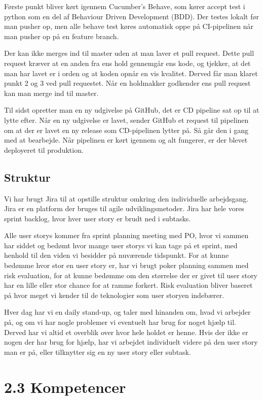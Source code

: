 \documentclass[11pt]{report}
\begin{document}
Første punkt bliver kørt igennem Cucumber’s Behave, som kører accept test i python som en del af Behaviour Driven Development (BDD). 
Der testes lokalt før man pusher op, men alle behave test køres automatisk oppe på CI-pipelinen når man pusher op på en feature branch. 

Der kan ikke merges ind til master uden at man laver et pull request. 
Dette pull request kræver at en anden fra ens hold gennemgår ens kode, og tjekker, at det man har lavet er i orden 
og at koden opnår en vis kvalitet. Derved får man klaret punkt 2 og 3 ved pull requestet. 
Når en holdmakker godkender ens pull request kan man merge ind til master.

Til sidst opretter man en ny udgivelse på GitHub, det er CD pipeline sat op til at lytte efter. 
Når en ny udgivelse er lavet, sender GitHub et request til pipelinen om at der er lavet en ny release som CD-pipelinen lytter på. 
Så går den i gang med at bearbejde. Når pipelinen er kørt igennem og alt fungerer, er der blevet deployeret til produktion. 


\subsection*{Struktur}
Vi har brugt Jira til at opstille struktur omkring den individuelle arbejdsgang. 
Jira er en platform der bruges til agile udviklingsmetoder. Jira har hele vores sprint backlog, hvor hver user story er brudt ned i subtasks. 

Alle user storys kommer fra sprint planning meeting med PO, hvor vi sammen har siddet og bedømt hvor mange user storys 
vi kan tage på et sprint, med henhold til den viden vi besidder på nuværende tidspunkt. 
For at kunne bedømme hvor stor en user story er, har vi brugt poker planning sammen med risk evaluation, 
for at kunne bedømme om den størrelse der er givet til user story har en lille eller stor chance for at ramme forkert. 
Risk evaluation bliver baseret på hvor meget vi kender til de teknologier som user storyen indebærer. 

Hver dag har vi en daily stand-up, og taler med hinanden om, hvad vi arbejder på, og om vi har nogle problemer vi eventuelt 
har brug for noget hjælp til. Derved har vi altid et overblik over hvor hele holdet er henne. 
Hvis der ikke er nogen der har brug for hjælp, har vi arbejdet individuelt videre på den user story man er på, 
eller tilknytter sig en ny user story eller subtask. 


\section*{2.3 Kompetencer}
\end{document}
